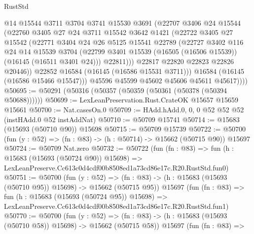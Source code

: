 \begin{lexlean}{RustStd}
\begin{coremodule}
                @14
                @15544
                @3711
                @3704
                @3741
                @15530
                @3691
                (@22707
                  @3406
                  @24
                  @15544
                  (@22760
                    @3405
                    @27
                    @24
                    @3711
                    @15542
                    @3642
                    @1421
                    (@22722
                      @3405
                      @27
                      @15542
                      (@22771
                        @3404
                        @24
                        @26
                        @5125
                        @15541
                        @22789
                        (@22727
                          @3402
                          @116
                          @24
                          @14
                          @15539
                          @3704
                          (@22799 @3401 @15539 (@16505 (@16506 @15539)) (@16145 (@16511 @3401 @24)))
                          @22811)))
                    @22817
                    @22820
                    @22823
                    @22826
                    @20446))
                @22852
                @16584
                (@16145 (@16586 @15531 @3711)))
              @16584
              (@16145 (@16586 @15466 @15547)))
            @45596
            @45599
            @45602
            @45606
            @45611
            @45617))))
@50695 := @50291 (@50316 (@50357 (@50359 (@50361 (@50378 (@50394 @50688))))))
@50699 := LexLeanPreservation.Rust.CrateOK @15657 @15659 @15661
@50700 := Nat.casesOn.{0}
@50709 := HAdd.hAdd.{0, 0, 0} @52 @52 @52 (instHAdd.{0} @52 instAddNat)
@50710 := @50709 @15741
@50714 := @15683 (@15693 (@50710 @90)) @15698
@50715 := @50709 @15739
@50722 := @50700 (fun (y : @52) => (fn : @83) -> (h : @50714) -> @15662 (@50715 @90)) @15697
@50724 := @50709 Nat.zero
@50732 := @50722
    (fun (fn : @83) =>
    fun (h : @15683 (@15693 (@50724 @90)) @15698) =>
    LexLeanPreserve.Cc613c0d4cdf00b8508ed1a73cd86e17c.R20.RustStd.fun0)
@50751 := @50700
    (fun (y : @52) =>
    (fn : @83) -> (h : @15683 (@15693 (@50710 @95)) @15698) -> @15662 (@50715 @95))
    @15697
    (fun (fn : @83) =>
    fun (h : @15683 (@15693 (@50724 @95)) @15698) =>
    LexLeanPreserve.Cc613c0d4cdf00b8508ed1a73cd86e17c.R20.RustStd.fun1)
@50770 := @50700
    (fun (y : @52) =>
    (fn : @83) -> (h : @15683 (@15693 (@50710 @58)) @15698) -> @15662 (@50715 @58))
    @15697
    (fun (fn : @83) =>

\end{coremodule}
\end{lexlean}
